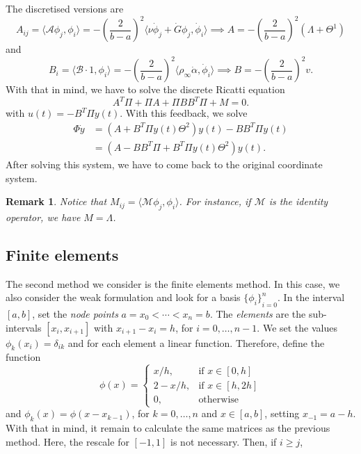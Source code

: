 \documentclass[12pt]{article}
\newcommand{\A}{\mathcal{A}}
\newcommand{\B}{\mathcal{B}}
\newcommand{\steady}{\rho_{\infty}}
\newcommand{\inner}[2]{\langle{} #1, #2 \rangle{}}
\newtheorem{remark}{Remark}[subsection]
\theoremstyle{definition}
\begin{document}
The discretised versions are 
\[
A_{ij} = \inner{\A \phi_j}{\phi_i} = -{\left(\frac{2}{b-a}\right)}^2\inner{\nu \dot \phi_j + \dot G \phi_j}{\dot \phi_i} \implies A = -{\left(\frac{2}{b-a}\right)}^2(\Lambda + \Theta^1)
\]
and 
\[
B_{i} = \inner{\B\cdot 1}{\phi_i} = -{\left(\frac{2}{b-a}\right)}^2\inner{\steady \dot\alpha}{\dot\phi_i} \implies B = -{\left(\frac{2}{b-a}\right)}^2 v.
\]
With that in mind, we have to solve the discrete Ricatti equation
\[
A^T\Pi + \Pi A + \Pi B B^T \Pi + M = 0.
\]
with $u(t) = -B^T\Pi y(t)$. 
With this feedback, we solve
\[
\begin{split}
    \Phi \dot{y} &= (A + B^T\Pi y(t) \Theta^2 )y(t) - BB^T\Pi y(t) \\ 
    &= (A - BB^T\Pi  + B^T\Pi y(t) \Theta^2)y(t).
\end{split}
\]
After solving this system, we have to come back to the original coordinate system.

\begin{remark}
    Notice that $M_{ij} = \inner{\mathcal{M} \phi_j}{\phi_i}$.
    For instance, if $\mathcal{M}$ is the identity operator, we have $M = \Lambda$.
\end{remark}

\subsection{Finite elements}

The second method we consider is the finite elements method. 
In this case, we also consider the weak formulation and look for a basis ${\{\phi_i\}}_{i=0}^{n}$.
In the interval $[a,b]$, set the {\em node points\/} $a = x_0 < \cdots < x_n = b$.
The {\em elements\/} are the sub-intervals $[x_i, x_{i+1}]$ with $x_{i+1}-x_i=h$, for $i=0, \dots, n-1$.
We set the values $\phi_k(x_i) = \delta_{ik}$ and for each element a linear function. 
Therefore, define the function
\[
\phi(x) = \begin{cases}
    x/h, &\text{if } x \in[0,h] \\
    2 - x/h, &\text{if } x \in [h,2h] \\
    0, &\text{otherwise}
\end{cases} 
\]
and $\phi_{k}(x) = \phi(x-x_{k-1})$, for $k=0, \dots, n$ and $x \in [a,b]$, setting $x_{-1} = a-h$.
With that in mind, it remain to calculate the same matrices as the previous method.
Here, the rescale for $[-1,1]$ is not necessary.
Then, if $i \ge j$,
\end{document}
